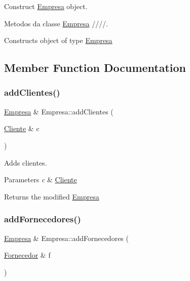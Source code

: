 Construct \hyperlink{classEmpresa}{Empresa} object. 

Metodos da classe \hyperlink{classEmpresa}{Empresa} ////.

Constructs object of type \hyperlink{classEmpresa}{Empresa} 

\subsection{Member Function Documentation}
\mbox{\label{classEmpresa_a57597ec4154f274686bc648ccf5d2a59}} 
\subsubsection{\texorpdfstring{add\+Clientes()}{addClientes()}}
{\footnotesize\ttfamily \hyperlink{classEmpresa}{Empresa} \& Empresa\+::add\+Clientes (\begin{DoxyParamCaption}\item[{\hyperlink{classCliente}{Cliente} \&}]{c }\end{DoxyParamCaption})}



Adds clientes. 


\begin{DoxyParams}{Parameters}
{\em c} & \hyperlink{classCliente}{Cliente}\\
\hline
\end{DoxyParams}
\begin{DoxyReturn}{Returns}
the modified \hyperlink{classEmpresa}{Empresa} 
\end{DoxyReturn}
\mbox{\label{classEmpresa_a0c858479d6e92094adbb2fc085039376}} 
\subsubsection{\texorpdfstring{add\+Fornecedores()}{addFornecedores()}}
{\footnotesize\ttfamily \hyperlink{classEmpresa}{Empresa} \& Empresa\+::add\+Fornecedores (\begin{DoxyParamCaption}\item[{\hyperlink{classFornecedor}{Fornecedor} \&}]{f }\end{DoxyParamCaption})}




